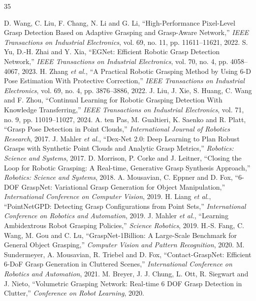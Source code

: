 \documentclass[lettersize,journal]{IEEEtran}
\begin{document}
\begin{thebibliography}{35}

 D. Wang, C. Liu, F. Chang, N. Li and G. Li, ``High-Performance Pixel-Level Grasp Detection Based on Adaptive Grasping and Grasp-Aware Network,'' \emph{IEEE Transactions on Industrial Electronics}, vol. 69, no. 11, pp. 11611--11621, 2022.
 S. Yu, D.-H. Zhai and Y. Xia, ``EGNet: Efficient Robotic Grasp Detection Network,'' \emph{IEEE Transactions on Industrial Electronics}, vol. 70, no. 4, pp. 4058--4067, 2023.
 H. Zhang \emph{et al.}, ``A Practical Robotic Grasping Method by Using 6-D Pose Estimation With Protective Correction,'' \emph{IEEE Transactions on Industrial Electronics}, vol. 69, no. 4, pp. 3876--3886, 2022.
 J. Liu, J. Xie, S. Huang, C. Wang and F. Zhou, ``Continual Learning for Robotic Grasping Detection With Knowledge Transferring,'' \emph{IEEE Transactions on Industrial Electronics}, vol. 71, no. 9, pp. 11019--11027, 2024.
 A. ten Pas, M. Gualtieri, K. Saenko and R. Platt, ``Grasp Pose Detection in Point Clouds,'' \emph{International Journal of Robotics Research}, 2017.
 J. Mahler \emph{et al.}, ``Dex-Net 2.0: Deep Learning to Plan Robust Grasps with Synthetic Point Clouds and Analytic Grasp Metrics,'' \emph{Robotics: Science and Systems}, 2017.
 D. Morrison, P. Corke and J. Leitner, ``Closing the Loop for Robotic Grasping: A Real-time, Generative Grasp Synthesis Approach,'' \emph{Robotics: Science and Systems}, 2018.
 A. Mousavian, C. Eppner and D. Fox, ``6-DOF GraspNet: Variational Grasp Generation for Object Manipulation,'' \emph{International Conference on Computer Vision}, 2019.
 H. Liang \emph{et al.}, ``PointNetGPD: Detecting Grasp Configurations from Point Sets,'' \emph{International Conference on Robotics and Automation}, 2019.
 J. Mahler \emph{et al.}, ``Learning Ambidextrous Robot Grasping Policies,'' \emph{Science Robotics}, 2019.
 H.-S. Fang, C. Wang, M. Gou and C. Lu, ``GraspNet-1Billion: A Large-Scale Benchmark for General Object Grasping,'' \emph{Computer Vision and Pattern Recognition}, 2020.
 M. Sundermeyer, A. Mousavian, R. Triebel and D. Fox, ``Contact-GraspNet: Efficient 6-DoF Grasp Generation in Cluttered Scenes,'' \emph{International Conference on Robotics and Automation}, 2021.
 M. Breyer, J. J. Chung, L. Ott, R. Siegwart and J. Nieto, ``Volumetric Grasping Network: Real-time 6 DOF Grasp Detection in Clutter,'' \emph{Conference on Robot Learning}, 2020.

\end{thebibliography}
\end{document}
